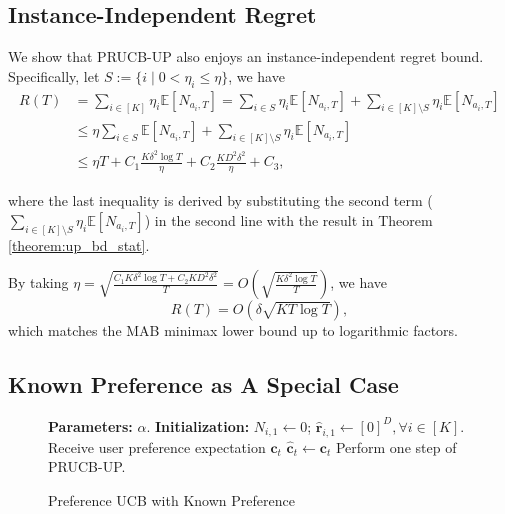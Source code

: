 \subsection{Instance-Independent Regret}
\label{sec:app_unknown_inst_indep_bound}

We show that PRUCB-UP also enjoys an instance-independent regret bound.
Specifically, let $S := \{ i \mid 0<\eta_i\leq\eta\}$, we have
\[
\begin{aligned}
R(T) &= \sum_{i \in [K]} \eta_i \mathbb{E} [N_{a_i,T}] = \sum_{i \in S} \eta_i \mathbb{E} [N_{a_i,T}] + \sum_{i \in [K] \setminus S} \eta_i \mathbb{E} [N_{a_i,T}] \\
& \leq \eta\sum_{i \in S} \mathbb{E} [N_{a_i,T}] + \sum_{i \in [K] \setminus S} \eta_i \mathbb{E} [N_{a_i,T}] \\
& \leq \eta T + C_1\frac{K \delta^2 \log T}{\eta} + C_2 \frac{K D^2 \delta^2}{\eta} + C_3,
\end{aligned}
\]

where the last inequality is derived by substituting the second term ($\sum_{i \in [K] \setminus S} \eta_i \mathbb{E} [N_{a_i,T}]$) in the second line with the result in Theorem \ref{theorem:up_bd_stat}. 

By taking $\eta = \sqrt{ \frac{C_1 K \delta^2 \log T + C_2 K D^2 \delta^2}{T} } = O(\sqrt{\frac{K \delta^2 \log T}{T}})$, we have 
\[
R(T) = O( \delta \sqrt{K T \log T}),
\]
which matches the MAB minimax lower bound up to logarithmic factors.


\subsection{Known Preference as A Special Case }
\label{sec:app_up_bd_stat_known}

\begin{wrapfigure}{r}{0.45\textwidth} %
\begin{minipage}{0.45\textwidth}
\begin{algorithm}[H]
\caption{Preference UCB with Known Preference}
\label{alg:PRUCB_KP}
\begin{algorithmic}
\State \textbf{Parameters:} $\alpha$.
\State \textbf{Initialization:} 
$N_{i, 1} \!\leftarrow\! 0$; $\boldsymbol{\hat{r}}_{i,1} \!\leftarrow\! [0]^{D}, \forall i \!\in\! [K]$.
    \State Receive user preference expectation $\boldsymbol{c}_t$
    \State $\hat{\boldsymbol{c}}_{t} \leftarrow \boldsymbol{c}_t$
    \State Perform one step of PRUCB-UP.
\EndFor
\end{algorithmic}
\end{algorithm}
 \end{minipage}
\end{wrapfigure}

